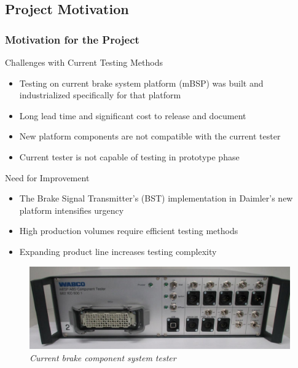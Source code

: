 \documentclass[8pt,compress,aspectratio=169]{beamer}
\begin{document}
\subsection{Project Motivation}
\begin{frame}
    \frametitle{Motivation for the Project}
    \begin{minipage}{0.475\textwidth}
    \begin{block}{Challenges with Current Testing Methods}
        \begin{itemize}
            \small
            \item Testing on current brake system platform (mBSP) was built and industrialized specifically for that platform
            \item Long lead time and significant cost to release and document
            \item New platform components are not compatible with the current tester
            \item Current tester is not capable of testing in prototype phase
        \end{itemize}
    \end{block}
    \begin{block}{Need for Improvement}
      \small
        \begin{itemize}
          \item The Brake Signal Transmitter's (BST) implementation in Daimler's new platform intensifies urgency
            \item High production volumes require efficient testing methods 
            \item Expanding product line increases testing complexity
        \end{itemize}
    \end{block}
    \end{minipage}
    \hfill
    \begin{minipage}{0.475\textwidth}
        \begin{figure}
          \includegraphics[width=\textwidth]{assets/misc/abs-tester.png}
          \caption{\it Current brake component system tester}
        \end{figure}
    \end{minipage}
\end{frame}
\end{document}
